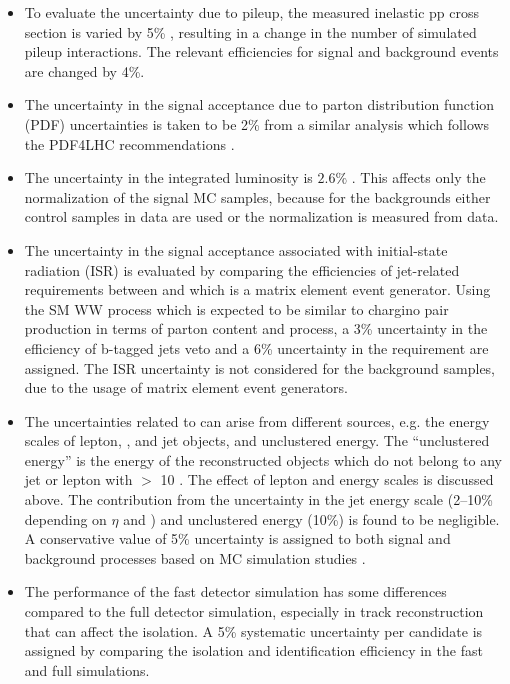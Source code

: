 \begin{itemize}
\item To evaluate the uncertainty due to pileup, the measured inelastic pp cross section is
  varied by 5\% \cite{Antchev:2011vs}, resulting in a change in the number of simulated pileup interactions.
 The relevant efficiencies for signal and background events are changed by 4\%.

\item The uncertainty in the signal acceptance due to parton distribution function (PDF) uncertainties 
  is taken to be 2\% from a similar analysis \cite{Khachatryan:2014qwa} which follows the PDF4LHC recommendations \cite{pdf4lhc}.

\item The uncertainty in the integrated luminosity  is $2.6\%$ \cite{CMS-PAS-LUM-13-001}.  This affects only the
  normalization of the signal MC samples, because for the backgrounds  either control samples in data are used or the normalization is measured from data.

\item The uncertainty in the signal acceptance associated with initial-state radiation (ISR)
is evaluated by comparing the efficiencies of jet-related requirements between \PYTHIA
 and \MADGRAPH which is a matrix element event generator. Using the SM WW process which
 is expected to be similar to chargino pair production in terms of parton content and process, a 3\% uncertainty in 
the efficiency of  b-tagged jets veto and a 6\% uncertainty in the \deltaphi requirement are assigned. The ISR
 uncertainty is not considered for the background samples, due to the usage of matrix element event generators.

\item The uncertainties related to \MPT can arise from different sources, e.g.  the energy scales of lepton, \Tau, and jet 
objects, and unclustered energy.  The ``unclustered energy'' is the energy of the reconstructed objects which
 do not belong to any jet or lepton with \PT $>$ 10 \GeV. The effect of lepton and \Tau
 energy scales is discussed above. The contribution from the uncertainty in the jet energy scale (2--10\% depending on $\eta$  and \PT) and
 unclustered energy (10\%) is found to be negligible. A conservative value of 5\% uncertainty
 is assigned to both signal and background processes based on MC simulation studies \cite{Khachatryan:2015kxa, Khachatryan:2014qwa}.

\item The performance of the fast detector simulation has some differences compared to the full detector simulation, especially in
 track reconstruction \cite{Khachatryan:2015kxa} that can affect the \Tau isolation. A 5\% systematic uncertainty per
 \Tau candidate is assigned by comparing the \Tau isolation and identification efficiency in the fast
 and full simulations. 



\end{itemize}
